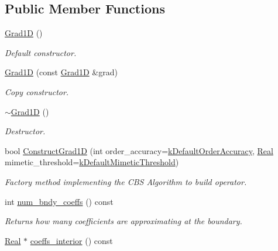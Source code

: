 \subsection*{Public Member Functions}
\begin{DoxyCompactItemize}
\item 
\hyperlink{classmtk_1_1Grad1D_ae21e6ac2652e653c48f15b304ee83a75}{Grad1\+D} ()
\begin{DoxyCompactList}\small\item\em Default constructor. \end{DoxyCompactList}\item 
\hyperlink{classmtk_1_1Grad1D_a5708bcb61bde3f7f3a4ddede191d82a4}{Grad1\+D} (const \hyperlink{classmtk_1_1Grad1D}{Grad1\+D} \&grad)
\begin{DoxyCompactList}\small\item\em Copy constructor. \end{DoxyCompactList}\item 
\hyperlink{classmtk_1_1Grad1D_a2f9b1d306c0f09f36145bb1e7e486b54}{$\sim$\+Grad1\+D} ()
\begin{DoxyCompactList}\small\item\em Destructor. \end{DoxyCompactList}\item 
bool \hyperlink{classmtk_1_1Grad1D_a74ef5245cfae6fd158bd7f563a0c2e52}{Construct\+Grad1\+D} (int order\+\_\+accuracy=\hyperlink{group__c01-roots_ga0d95560098eb36420511103637b6952f}{k\+Default\+Order\+Accuracy}, \hyperlink{group__c01-roots_gac080bbbf5cbb5502c9f00405f894857d}{Real} mimetic\+\_\+threshold=\hyperlink{group__c01-roots_ga35718d949bdc81a08a9cc8ebbe3478a2}{k\+Default\+Mimetic\+Threshold})
\begin{DoxyCompactList}\small\item\em Factory method implementing the C\+B\+S Algorithm to build operator. \end{DoxyCompactList}\item 
int \hyperlink{classmtk_1_1Grad1D_a7168205c21ba00012558f8bba069c119}{num\+\_\+bndy\+\_\+coeffs} () const 
\begin{DoxyCompactList}\small\item\em Returns how many coefficients are approximating at the boundary. \end{DoxyCompactList}\item 
\hyperlink{group__c01-roots_gac080bbbf5cbb5502c9f00405f894857d}{Real} $\ast$ \hyperlink{classmtk_1_1Grad1D_a88735f8d2a6ed986370dc3caeb84959b}{coeffs\+\_\+interior} () const 

\end{DoxyCompactItemize}
